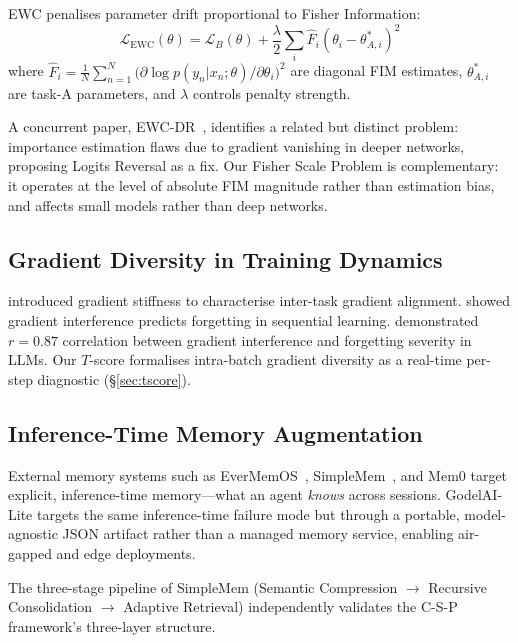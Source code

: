 \documentclass[12pt]{article}
\newcommand{\tscore}{$T$\nobreakdash-score\xspace}
\begin{document}
EWC penalises parameter drift proportional to Fisher Information:
\begin{equation}
  \mathcal{L}_{\mathrm{EWC}}(\theta)
  = \mathcal{L}_B(\theta)
  + \frac{\lambda}{2}\sum_i \hat{F}_i(\theta_i - \theta_{A,i}^*)^2
  \label{eq:ewc}
\end{equation}
where $\hat{F}_i = \frac{1}{N}\sum_{n=1}^N
\bigl(\partial \log p(y_n|x_n;\theta)/\partial\theta_i\bigr)^2$
are diagonal FIM estimates, $\theta_{A,i}^*$ are task-A parameters,
and $\lambda$ controls penalty strength.

A concurrent paper, EWC-DR~\citep{ewcdr2026}, identifies a related but
distinct problem: importance estimation flaws due to gradient vanishing in
deeper networks, proposing Logits Reversal as a fix. Our Fisher Scale Problem
is complementary: it operates at the level of absolute FIM magnitude rather
than estimation bias, and affects small models rather than deep networks.

\subsection{Gradient Diversity in Training Dynamics}

\citet{fort2019stiffness} introduced gradient stiffness to characterise
inter-task gradient alignment. \citet{mirzadeh2020understanding} showed gradient
interference predicts forgetting in sequential learning. \citet{yin2024mechanistic}
demonstrated $r{=}0.87$ correlation between gradient interference and forgetting
severity in LLMs. Our \tscore{} formalises intra-batch gradient diversity as a
real-time per-step diagnostic (\S\ref{sec:tscore}).

\subsection{Inference-Time Memory Augmentation}

External memory systems such as EverMemOS~\citep{evermemos2026},
SimpleMem~\citep{simplemem2026}, and Mem0 target explicit, inference-time
memory---what an agent \emph{knows} across sessions.
GodelAI-Lite targets the same inference-time failure mode but through a
portable, model-agnostic JSON artifact rather than a managed memory service,
enabling air-gapped and edge deployments.

The three-stage pipeline of SimpleMem (Semantic Compression $\to$ Recursive
Consolidation $\to$ Adaptive Retrieval) independently validates the C-S-P
framework's three-layer structure.
\end{document}
